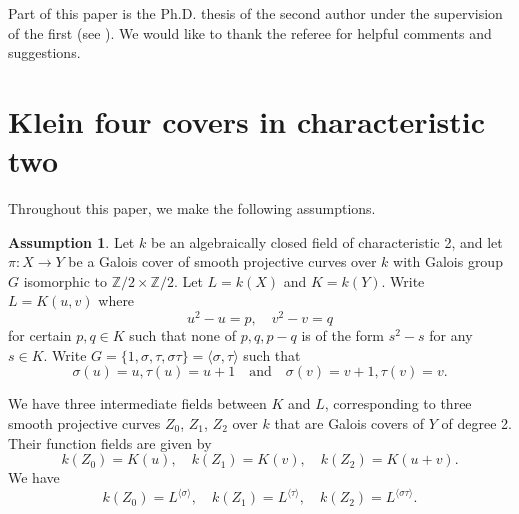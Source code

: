 \documentclass{amsart}
\numberwithin{equation}{section}
\numberwithin{table}{section}
\theoremstyle{plain}
\theoremstyle{definition}
\newtheorem{assume}[theorem]{Assumption}
\theoremstyle{remark}
\begin{document}
Part of this paper is the Ph.D. thesis of the second author under the supervision of the first (see \cite{CamachoThesis2021}). We would like to thank the referee for helpful comments and suggestions.




\section{Klein four covers in characteristic two}
\label{s:klein4}

Throughout this paper, we make the following assumptions.

\begin{assume}
\label{ass:general}
Let $k$ be an algebraically closed field of characteristic 2, and let $\pi:X \to Y$ be a Galois cover of smooth projective curves over $k$ with Galois group $G$ isomorphic to $\mathbb{Z}/2\times \mathbb{Z}/2$. Let $L=k(X)$ and $K=k(Y)$. Write $L = K(u,v)$ where 
\begin{equation}
\label{eq:field}
u^2-u=p, \quad v^2-v=q
\end{equation}
for certain $p,q\in K$ such that none of $p,q,p-q$ is of the form $s^2-s$ for any $s\in K$.
Write $G=\{1,\sigma,\tau,\sigma\tau\} = \langle \sigma, \tau\rangle$ such that
\begin{equation}
\label{eq:Gaction}
\sigma(u)=u,\tau(u)=u+1 \quad \mbox{and} \quad \sigma(v)=v+1,\tau(v)=v.
\end{equation}
\end{assume}

We have three intermediate fields between $K$ and $L$, corresponding to three smooth projective curves $Z_0$, $Z_1$, $Z_2$ over $k$ that are Galois covers of $Y$ of degree 2. Their function fields are given by
\begin{equation}
\label{eq:3curves}
k(Z_0)=K(u),\quad k(Z_1)=K(v),\quad k(Z_2)=K(u+v).
\end{equation}
We have
$$k(Z_0)=L^{\langle \sigma\rangle},\quad k(Z_1)=L^{\langle \tau\rangle},\quad k(Z_2)=L^{\langle \sigma\tau\rangle}.$$
\end{document}
